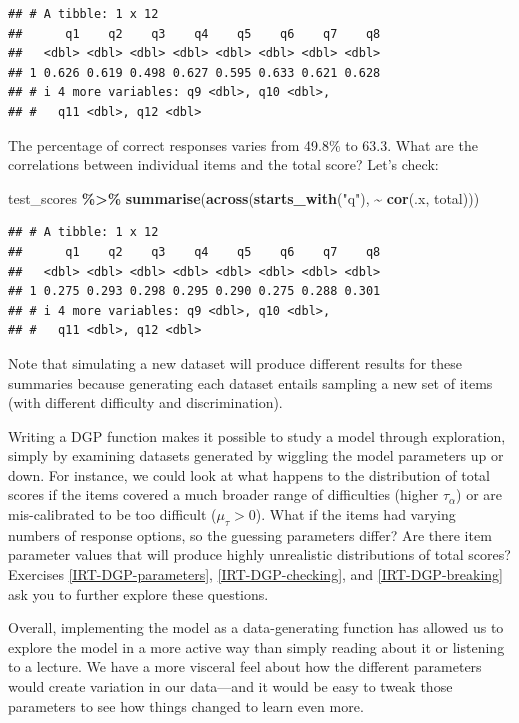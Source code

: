 \documentclass[
]{book}
\newenvironment{Shaded}{\begin{snugshade}}{\end{snugshade}}
\newcommand{\FunctionTok}[1]{\textcolor[rgb]{0.13,0.29,0.53}{\textbf{#1}}}
\newcommand{\NormalTok}[1]{#1}
\newcommand{\SpecialCharTok}[1]{\textcolor[rgb]{0.81,0.36,0.00}{\textbf{#1}}}
\newcommand{\StringTok}[1]{\textcolor[rgb]{0.31,0.60,0.02}{#1}}
\begin{document}
\begin{verbatim}
## # A tibble: 1 x 12
##      q1    q2    q3    q4    q5    q6    q7    q8
##   <dbl> <dbl> <dbl> <dbl> <dbl> <dbl> <dbl> <dbl>
## 1 0.626 0.619 0.498 0.627 0.595 0.633 0.621 0.628
## # i 4 more variables: q9 <dbl>, q10 <dbl>,
## #   q11 <dbl>, q12 <dbl>
\end{verbatim}

The percentage of correct responses varies from 49.8\% to 63.3.
What are the correlations between individual items and the total score?
Let's check:

\begin{Shaded}
\begin{Highlighting}[]
\NormalTok{test\_scores }\SpecialCharTok{\%\textgreater{}\%}
  \FunctionTok{summarise}\NormalTok{(}\FunctionTok{across}\NormalTok{(}\FunctionTok{starts\_with}\NormalTok{(}\StringTok{"q"}\NormalTok{), }\SpecialCharTok{\textasciitilde{}} \FunctionTok{cor}\NormalTok{(.x, total)))}
\end{Highlighting}
\end{Shaded}

\begin{verbatim}
## # A tibble: 1 x 12
##      q1    q2    q3    q4    q5    q6    q7    q8
##   <dbl> <dbl> <dbl> <dbl> <dbl> <dbl> <dbl> <dbl>
## 1 0.275 0.293 0.298 0.295 0.290 0.275 0.288 0.301
## # i 4 more variables: q9 <dbl>, q10 <dbl>,
## #   q11 <dbl>, q12 <dbl>
\end{verbatim}

Note that simulating a new dataset will produce different results for these summaries because generating each dataset entails sampling a new set of items (with different difficulty and discrimination).

Writing a DGP function makes it possible to study a model through exploration, simply by examining datasets generated by wiggling the model parameters up or down.
For instance, we could look at what happens to the distribution of total scores if the items covered a much broader range of difficulties (higher \(\tau_\alpha\)) or are mis-calibrated to be too difficult (\(\mu_\tau > 0\)).
What if the items had varying numbers of response options, so the guessing parameters differ?
Are there item parameter values that will produce highly unrealistic distributions of total scores?
Exercises \ref{IRT-DGP-parameters}, \ref{IRT-DGP-checking}, and \ref{IRT-DGP-breaking} ask you to further explore these questions.

Overall, implementing the model as a data-generating function has allowed us to explore the model in a more active way than simply reading about it or listening to a lecture.
We have a more visceral feel about how the different parameters would create variation in our data---and it would be easy to tweak those parameters to see how things changed to learn even more.
\end{document}
